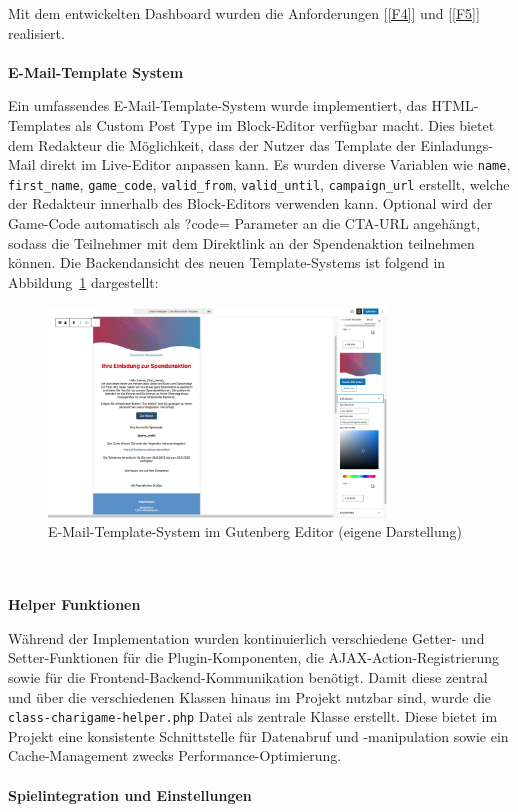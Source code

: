 Mit dem entwickelten Dashboard wurden die Anforderungen [\ref{F4}] und [\ref{F5}] realisiert.
\\\\
\textbf{E-Mail-Template System}

Ein umfassendes E-Mail-Template-System wurde implementiert, das HTML-Templates als Custom Post Type im Block-Editor verfügbar macht.
Dies bietet dem Redakteur die Möglichkeit, dass der Nutzer das Template der Einladungs-Mail direkt im Live-Editor anpassen kann.
Es wurden diverse Variablen wie \texttt{name}, \texttt{first\_name}, \texttt{game\_code}, \texttt{valid\_from}, \texttt{valid\_until}, \texttt{campaign\_url} erstellt, welche der Redakteur innerhalb des Block-Editors verwenden kann.
Optional wird der Game-Code automatisch als ?code= Parameter an die CTA-URL angehängt, sodass die Teilnehmer mit dem Direktlink an der Spendenaktion teilnehmen können.
Die Backendansicht des neuen Template-Systems ist folgend in Abbildung~\ref{fig:new-email-backend} dargestellt:

\begin{figure}[H]
    \centering
    \includegraphics[width=0.8\textwidth]{images/new_email_backend}
    \caption{E-Mail-Template-System im Gutenberg Editor (eigene Darstellung)}
    \label{fig:new-email-backend}
\end{figure}

\\\\
\textbf{Helper Funktionen}

Während der Implementation wurden kontinuierlich verschiedene Getter- und Setter-Funktionen für die Plugin-Komponenten, die AJAX-Action-Registrierung sowie für die Frontend-Backend-Kommunikation benötigt.
Damit diese zentral und über die verschiedenen Klassen hinaus im Projekt nutzbar sind, wurde die\\ \texttt{class-charigame-helper.php} Datei als zentrale Klasse erstellt.
Diese bietet im Projekt eine konsistente Schnittstelle für Datenabruf und -manipulation sowie ein Cache-Management zwecks Performance-Optimierung.
\\\\
\textbf{Spielintegration und Einstellungen}


